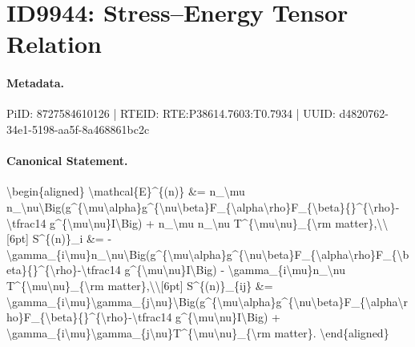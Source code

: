 \section*{ID9944: Stress–Energy Tensor Relation}
\paragraph{Metadata.}
PiID: 8727584610126 | RTEID: RTE:P38614.7603:T0.7934 | UUID: d4820762-34e1-5198-aa5f-8a468861bc2c

\paragraph{Canonical Statement.}
\textbackslash{}begin\{aligned\} \textbackslash{}mathcal\{E\}\textasciicircum{}\{(n)\} \&= n\_\textbackslash{}mu n\_\textbackslash{}nu\textbackslash{}Big(g\textasciicircum{}\{\textbackslash{}mu\textbackslash{}alpha\}g\textasciicircum{}\{\textbackslash{}nu\textbackslash{}beta\}F\_\{\textbackslash{}alpha\textbackslash{}rho\}F\_\{\textbackslash{}beta\}\{\}\textasciicircum{}\{\textbackslash{}rho\}-\textbackslash{}tfrac14 g\textasciicircum{}\{\textbackslash{}mu\textbackslash{}nu\}I\textbackslash{}Big) + n\_\textbackslash{}mu n\_\textbackslash{}nu T\textasciicircum{}\{\textbackslash{}mu\textbackslash{}nu\}\_\{\textbackslash{}rm matter\},\textbackslash{}\textbackslash{}[6pt] S\textasciicircum{}\{(n)\}\_i \&= -\textbackslash{}gamma\_\{i\textbackslash{}mu\}n\_\textbackslash{}nu\textbackslash{}Big(g\textasciicircum{}\{\textbackslash{}mu\textbackslash{}alpha\}g\textasciicircum{}\{\textbackslash{}nu\textbackslash{}beta\}F\_\{\textbackslash{}alpha\textbackslash{}rho\}F\_\{\textbackslash{}beta\}\{\}\textasciicircum{}\{\textbackslash{}rho\}-\textbackslash{}tfrac14 g\textasciicircum{}\{\textbackslash{}mu\textbackslash{}nu\}I\textbackslash{}Big) - \textbackslash{}gamma\_\{i\textbackslash{}mu\}n\_\textbackslash{}nu T\textasciicircum{}\{\textbackslash{}mu\textbackslash{}nu\}\_\{\textbackslash{}rm matter\},\textbackslash{}\textbackslash{}[6pt] S\textasciicircum{}\{(n)\}\_\{ij\} \&= \textbackslash{}gamma\_\{i\textbackslash{}mu\}\textbackslash{}gamma\_\{j\textbackslash{}nu\}\textbackslash{}Big(g\textasciicircum{}\{\textbackslash{}mu\textbackslash{}alpha\}g\textasciicircum{}\{\textbackslash{}nu\textbackslash{}beta\}F\_\{\textbackslash{}alpha\textbackslash{}rho\}F\_\{\textbackslash{}beta\}\{\}\textasciicircum{}\{\textbackslash{}rho\}-\textbackslash{}tfrac14 g\textasciicircum{}\{\textbackslash{}mu\textbackslash{}nu\}I\textbackslash{}Big) + \textbackslash{}gamma\_\{i\textbackslash{}mu\}\textbackslash{}gamma\_\{j\textbackslash{}nu\}T\textasciicircum{}\{\textbackslash{}mu\textbackslash{}nu\}\_\{\textbackslash{}rm matter\}. \textbackslash{}end\{aligned\}

